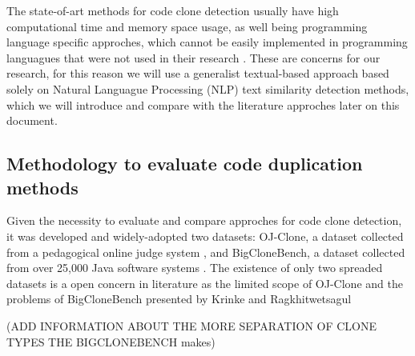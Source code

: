 The state-of-art methods for code clone detection usually have high computational time and memory space usage, as well being
programming language specific approches, which cannot be easily implemented in programming languagues that were not used in 
their research \citep{litreview}. These are concerns for our research, for this reason we will use a generalist textual-based 
approach based solely on Natural Languague Processing (NLP) text similarity detection methods, which we will introduce and compare
with the literature approches later on this document. 

\subsection{Methodology to evaluate code duplication methods}

\label{subsec:codemethods}

Given the necessity to evaluate and compare approches for code clone detection, it was developed and widely-adopted two datasets: 
OJ-Clone, a dataset collected from a pedagogical online judge system \citep{ojclone}, and BigCloneBench, a dataset collected from over 
25,000 Java software systems \citep{bigclonebench}. The existence of only two spreaded datasets is a open concern in literature as 
the limited scope of OJ-Clone and the problems of BigCloneBench presented by Krinke and Ragkhitwetsagul \citep{bigfail}

(ADD INFORMATION ABOUT THE MORE SEPARATION OF CLONE TYPES THE BIGCLONEBENCH makes)











